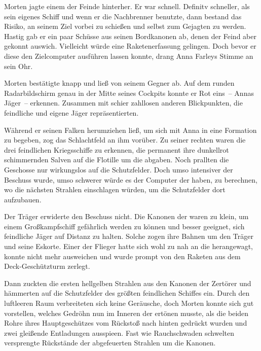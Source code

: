 Morten jagte einem der Feinde hinterher. Er war schnell. Definitv schneller, als sein eigenes Schiff und wenn er die Nachbrenner benutzte, dann bestand das Risiko, an seinem Ziel vorbei zu schießen und selbst zum Gejagten zu werden. Hastig gab er ein paar Schüsse aus seinen Bordkanonen ab, denen der Feind aber gekonnt auswich. Vielleicht würde eine Raketenerfassung gelingen. Doch bevor er diese den Zielcomputer ausführen lassen konnte, drang Anna Farleys Stimme an sein Ohr.

\par


\par

Morten bestätigte knapp und ließ von seinem Gegner ab. Auf dem runden Radarbildschirm genau in der Mitte seines Cockpits konnte er Rot eins~-- Annas Jäger~-- erkennen. Zusammen mit schier zahllosen anderen Blickpunkten, die feindliche und eigene Jäger repräsentierten.

\par

Während er seinen Falken herumziehen ließ, um sich mit Anna in eine Formation zu begeben, zog das Schlachtfeld an ihm vorüber. Zu seiner rechten waren die drei feindlichen Kriegsschiffe zu erkennen, die permanent ihre dunkellrot schimmernden Salven auf die Flotille um die  abgaben. Noch prallten die Geschosse nur wirkungslos auf die Schutzfelder. Doch umso intensiver der Beschuss wurde, umso schwerer würde es der Computer der  haben, zu berechnen, wo die nächsten Strahlen einschlagen würden, um die Schutzfelder dort aufzubauen.

\par

Der Träger erwiderte den Beschuss nicht. Die Kanonen der  waren zu klein, um einem Großkampfschiff gefährlich werden zu können und besser geeignet, sich feindliche Jäger auf Distanz zu halten. Solche zogen ihre Bahnen um den Träger und seine Eskorte. Einer der Flieger hatte sich wohl zu nah an die  herangewagt, konnte nicht mehr ausweichen und wurde prompt von den Raketen aus dem Deck-Geschützturm zerlegt.

\par

Dann zuckten die ersten hellgelben Strahlen aus den Kanonen der Zertörer und hämmerten auf die Schutzfelder des größten feindlichen Schiffes ein. Durch den luftleeren Raum verbreiteten sich keine Geräusche, doch Morten konnte sich gut vorstellen, welches Gedröhn nun im Inneren der  ertönen musste, als die beiden Rohre ihres Hauptgeschützes vom Rückstoß nach hinten gedrückt wurden und zwei gleißende Entladungen ausspieen. Fast wie Rauchschwaden schwelten versprengte Rückstände der abgefeuerten Strahlen um die Kanonen.

